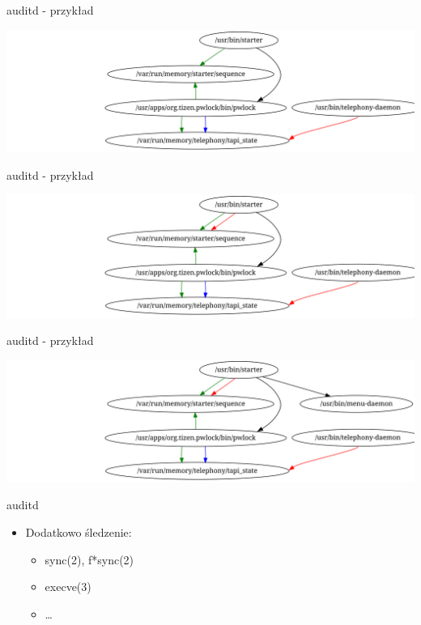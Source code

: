 \documentclass[presentation,aspectratio=43,12pt]{beamer}
\begin{document}
\begin{frame}[label=sec-4-12]{auditd - przykład}
\begin{center}
\includegraphics[width=\textwidth]{images/auditd-6}
\end{center}
\end{frame}

\begin{frame}[label=sec-4-13]{auditd - przykład}
\begin{center}
\includegraphics[width=\textwidth]{images/auditd-7}
\end{center}
\end{frame}
\begin{frame}[label=sec-4-14]{auditd - przykład}
\begin{center}
\includegraphics[width=\textwidth]{images/auditd-8}
\end{center}
\end{frame}
\begin{frame}[label=sec-4-15]{auditd}
\begin{itemize}
\item Dodatkowo śledzenie:
\begin{itemize}
\item sync(2), f*sync(2)
\item execve(3)
\item \ldots{}
\end{itemize}
\end{itemize}
\end{frame}
\end{document}
